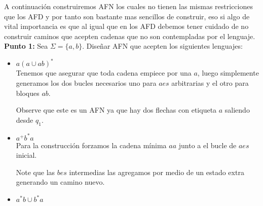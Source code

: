 
A continuación construiremos AFN los cuales no tienen las mismas restricciones que los AFD y por tanto son bastante mas sencillos de construir, eso si algo de vital importancia es que al igual que en los AFD debemos tener cuidado de no construir caminos que acepten cadenas que no son contempladas por el lenguaje.\\

  \textbf{Punto 1: }Sea $\Sigma=\{a,b\}.$ Diseñar AFN que acepten los siguientes lenguajes:

  \begin{itemize}[label={$\bullet$}]

        \item $a(a\cup ab)^*$\\

         Tenemos que asegurar que toda cadena empiece por una $a$, luego simplemente generamos los dos bucles necesarios uno para $aes$ arbitrarias y el otro para bloques $ab$.
        \begin{basedtikz}
        \centering
        \end{basedtikz}
        Observe que este es un AFN ya que hay dos flechas con etiqueta $a$ saliendo desde $q_1$.
        \item $a^+b^*a$\\

         Para la construcción forzamos la cadena mínima $aa$ junto a el bucle de $aes$ inicial.
        \begin{basedtikz}
        \centering
        \end{basedtikz}
        Note que las $bes$ intermedias las agregamos por medio de un estado extra generando un camino nuevo.
        \item $a^*b\cup b^*a$\\


\end{itemize}
